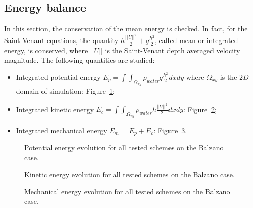 \subsection{Energy balance}

In this section, the conservation of the mean energy is checked. In fact, for the Saint-Venant equations,
the quantity $h \frac{||U||^2}{2} + g \frac{h^2}{2}$, called mean or integrated energy, is conserved,
where $||U||$ is the Saint-Venant depth averaged velocity magnitude.
The following quantities are studied:
\begin{itemize}
\item Integrated potential energy \textbf{$E_p =\int\int_{\Omega_{xy}}\rho_{water} g \frac{h^2}{2} dxdy$} where $\Omega_{xy}$ is the $2D$ domain of simulation: Figure~\ref{fig:balzano:Ep};
\item Integrated kinetic energy \textbf{$E_c =\int\int_{\Omega_{xy}} \rho_{water} h \frac{||U||^2}{2} dxdy$}: Figure~\ref{fig:balzano:Ec};
\item Integrated mechanical energy \textbf{$E_m = E_p + E_c$}: Figure~\ref{fig:balzano:Em}.
\end{itemize}

\begin{figure}[H]
  \centering
  \caption{Potential energy evolution for all tested schemes on the Balzano case.}
\label{fig:balzano:Ep}
\end{figure}

\begin{figure}[H]
  \centering
  \caption{Kinetic energy evolution for all tested schemes on the Balzano case.}
\label{fig:balzano:Ec}
\end{figure}

\begin{figure}[H]
  \centering
  \caption{Mechanical energy evolution for all tested schemes on the Balzano case.}
\label{fig:balzano:Em}
\end{figure}

